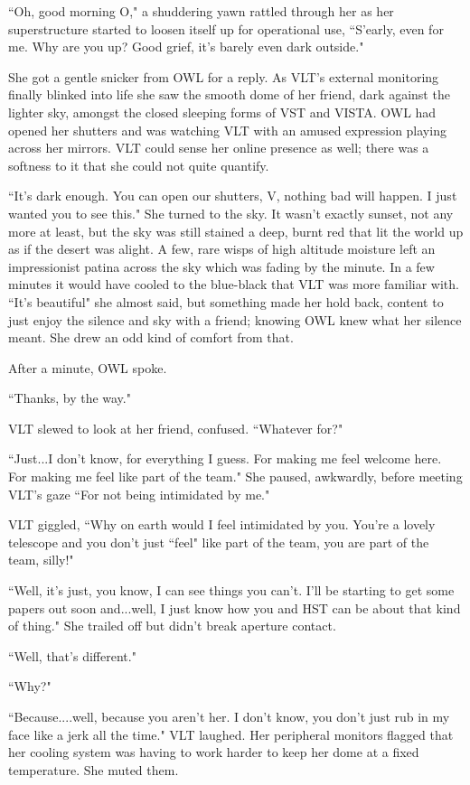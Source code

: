 \documentclass[12pt]{iopart}
\begin{document}
``Oh, good morning O," a shuddering yawn rattled through her as her superstructure started to loosen itself up for operational use, ``S'early, even for me. Why are you up? Good grief, it's barely even dark outside."

She got a gentle snicker from OWL for a reply. As VLT's external monitoring finally blinked into life she saw the smooth dome of her friend, dark against the lighter sky, amongst the closed sleeping forms of VST and VISTA. OWL had opened her shutters and was watching VLT with an amused expression playing across her mirrors. VLT could sense her online presence as well; there was a softness to it that she could not quite quantify.

``It's dark enough. You can open our shutters, V, nothing bad will happen. I just wanted you to see this." She turned to the sky. It wasn't exactly sunset, not any more at least, but the sky was still stained a deep, burnt red that lit the world up as if the desert was alight. A few, rare wisps of high altitude moisture left an impressionist patina across the sky which was fading by the minute. In a few minutes it would have cooled to the blue-black that VLT was more familiar with. ``It's beautiful" she almost said, but something made her hold back, content to just enjoy the silence and sky with a friend; knowing OWL knew what her silence meant. She drew an odd kind of comfort from that.

After a minute, OWL spoke.

``Thanks, by the way."

VLT slewed to look at her friend, confused. ``Whatever for?"

``Just...I don't know, for everything I guess. For making me feel welcome here. For making me feel like part of the team." She paused, awkwardly, before meeting VLT's gaze ``For not being intimidated by me."

VLT giggled, ``Why on earth would I feel intimidated by you. You're a lovely telescope and you don't just ``feel" like part of the team, you are part of the team, silly!"

``Well, it's just, you know, I can see things you can't. I'll be starting to get some papers out soon and...well, I just know how you and HST can be about that kind of thing." She trailed off but didn't break aperture contact.

``Well, that's different."

``Why?"

``Because....well, because you aren't her. I don't know, you don't just rub in my face like a jerk all the time." VLT laughed. Her peripheral monitors flagged that her cooling system was having to work harder to keep her dome at a fixed temperature. She muted them.
\end{document}
